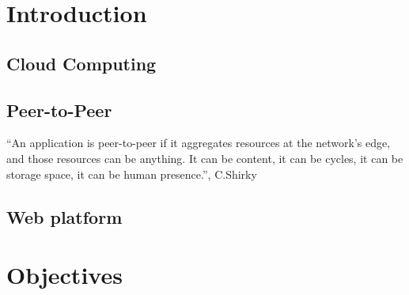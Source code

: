 \documentclass{./llncs2e/llncs}
\begin{document}

% 
% 

\section{Introduction}


\subsection{Cloud Computing}

\subsection{Peer-to-Peer}


  ``An application is peer-to-peer if it aggregates resources at the network’s edge, and those resources can be anything. It can be content, it can be cycles, it can be storage space, it can be human presence.'', C.Shirky \cite{Shirky.}


\subsection{Web platform}








% 
% 

\section{Objectives}





\end{document}
